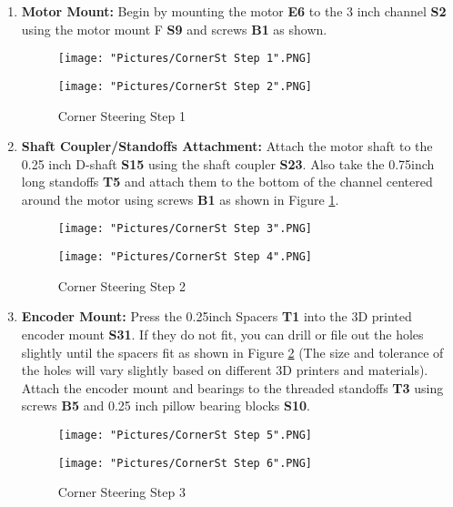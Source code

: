 \documentclass[12pt]{article}
\begin{document}
\begin{enumerate}
\item \textbf{Motor Mount:} Begin by mounting the motor \textbf{E6} to the 3 inch channel \textbf{S2} using the motor mount F \textbf{S9} and screws \textbf{B1} as shown.

\begin{figure}[H]
  \centering
  \begin{minipage}[b]{0.45\textwidth}
    \texttt{[image: "Pictures/CornerSt Step 1".PNG]}
  \end{minipage}
  \hfill
  \begin{minipage}[b]{0.45\textwidth}
    \texttt{[image: "Pictures/CornerSt Step 2".PNG]}
  \end{minipage}
  \caption{Corner Steering Step 1}
\end{figure}

\item \textbf{Shaft Coupler/Standoffs Attachment:} Attach the motor shaft to the 0.25 inch D-shaft \textbf{S15} using the shaft coupler \textbf{S23}. Also take the 0.75inch long standoffs \textbf{T5} and attach them to the bottom of the channel centered around the motor using screws \textbf{B1} as shown in Figure \ref{corner steering 2}.

\begin{figure}[H]
  \centering
  \begin{minipage}[b]{0.45\textwidth}
    \texttt{[image: "Pictures/CornerSt Step 3".PNG]}
  \end{minipage}
  \hfill
  \begin{minipage}[b]{0.45\textwidth}
    \texttt{[image: "Pictures/CornerSt Step 4".PNG]}
  \end{minipage}
  \caption{Corner Steering Step 2}
  \label{corner steering 2}
\end{figure}

\item \textbf{Encoder Mount:} Press the 0.25inch Spacers \textbf{T1} into the 3D printed encoder mount \textbf{S31}. If they do not fit, you can drill or file out the holes slightly until the spacers fit as shown in Figure \ref{corner steering 3} (The size and tolerance of the holes will vary slightly based on different 3D printers and materials). Attach the encoder mount and bearings to the threaded standoffs \textbf{T3} using screws \textbf{B5} and 0.25 inch pillow bearing blocks \textbf{S10}.

\begin{figure}[H]
  \centering
  \begin{minipage}[b]{0.45\textwidth}
    \texttt{[image: "Pictures/CornerSt Step 5".PNG]}
  \end{minipage}
  \hfill
  \begin{minipage}[b]{0.45\textwidth}
    \texttt{[image: "Pictures/CornerSt Step 6".PNG]}
  \end{minipage}
  \caption{Corner Steering Step 3}
  \label{corner steering 3}
\end{figure}


\end{enumerate}
\end{document}
